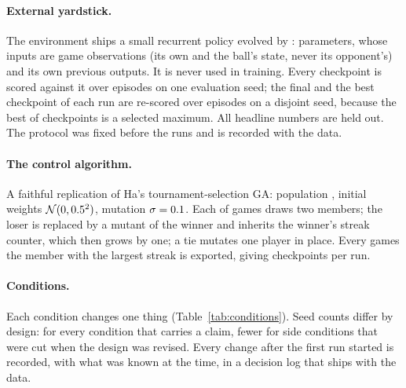 \documentclass[11pt]{article}
\begin{document}
\paragraph{External yardstick.}
The environment ships a small recurrent policy evolved by \citet{ha2015slime}:
\nBaselineParams{} parameters, whose \nBaselineInputs{} inputs are
\nBaselineGameInputs{} game observations (its own and the ball's state, never
its opponent's) and its own previous outputs. It is never used in training. Every checkpoint is scored against it over
\nSweepEpisodes{} episodes on one evaluation seed; the final and the best
checkpoint of each run are re-scored over \nSelectEpisodes{} episodes on a
disjoint seed, because the best of \nNCkpt{} checkpoints is a selected
maximum. All headline numbers are held out. The
protocol was fixed before the runs and is recorded with the data.

\paragraph{The control algorithm.}
A faithful replication of Ha's tournament-selection GA: population \nPop,
initial weights $\mathcal N(0,0.5^2)$, mutation $\sigma=0.1$.
Each of \nBudget{} games
draws two members; the loser is replaced by a mutant of the winner and
inherits the winner's streak counter, which then grows by one; a tie mutates
one player in place. Every \nSaveEvery{} games the member with the largest streak is
exported, giving \nNCkpt{} checkpoints per run.

\paragraph{Conditions.}
Each condition changes one thing (Table~\ref{tab:conditions}). Seed counts
differ by design: \nSeedsMain{} for every condition that carries a claim, fewer for side
conditions that were cut when the design was revised. Every change after the
first run started is recorded, with what was known at the time, in a decision
log that ships with the data.

\begin{table}[!htbp]
\centering\small
\caption{Conditions analysed. Two-population runs count once per seed.}
\label{tab:conditions}

\end{table}
\end{document}
